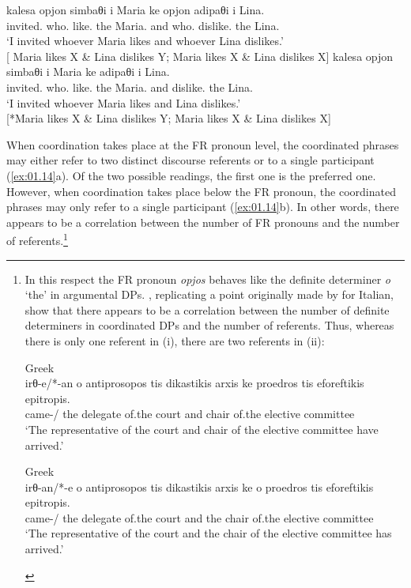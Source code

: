 \documentclass[output=paper]{langsci/langscibook}
\begin{document}
\ea {}\label{ex:01.14}
	\ea
		\gll kalesa opjon simbaθi i Maria ke opjon adipaθi i Lina.\\
			 invited.\Fsg{} who.\Acc{} like.\Tsg{} the Maria.\Nom{} and who.\Acc{} dislike.\Tsg{} the Lina.\Nom{}\\
		\glt \enquote*{I invited whoever Maria likes and whoever Lina dislikes.}\\
            {}[ Maria likes X \& Lina dislikes Y;  Maria likes X \& Lina dislikes X]
	\ex
		\gll kalesa opjon simbaθi i Maria ke adipaθi i Lina.\\
			 invited.\Fsg{} who.\Acc{} like.\Tsg{} the Maria.\Nom{} and dislike.\Tsg{} the Lina.\Nom{}\\
		\glt \enquote*{I invited whoever Maria likes and Lina dislikes.}\\
        {}[*Maria likes X \& Lina dislikes Y;  Maria likes X \& Lina dislikes X]
	\z
\z

When coordination takes place at the \gls{FR} pronoun level, the coordinated\linebreak
phrases may either refer to two distinct discourse referents or to a single
participant (\ref{ex:01.14}a). Of the two possible readings, the first one
is the preferred one. However, when coordination takes place below the \gls{FR}
pronoun, the coordinated phrases may only refer to a single participant
(\ref{ex:01.14}b). In other words, there appears to be a correlation
between the number of \gls{FR} pronouns and the number of
referents.\footnote{In this respect the \gls{FR} pronoun \emph{opjos} behaves
    like the definite determiner \emph{o} ‘the’ in argumental DPs.
    \textcite[67--68]{AleHaeSta2007}, replicating a point originally made by
    \citet{Longobardi1994} for Italian, show that there appears to be a
    correlation between the number of definite determiners in coordinated DPs
    and the number of referents. Thus, whereas there is only one referent in
    (i), there are two referents in (ii):

\begin{exe}
     Greek\\
	\gll irθ-e/*-an o antiprosopos tis {dikastikis arxis} ke proedros tis eforeftikis epitropis.\\
        came-\Tsg/\Pl{} the delegate of.the court and chair of.the elective committee\\
	\glt \enquote*{The representative of the court and chair of the elective committee have arrived.}

     Greek\\
    \gll irθ-an/*-e o antiprosopos tis {dikastikis arxis} ke o proedros tis eforeftikis epitropis.\\
        came-\Tpl/\Sg{} the delegate of.the court and the chair of.the elective committee\\
	\glt \enquote*{The representative of the court and the chair of the elective committee has arrived.}
\end{exe}
}
\end{document}
